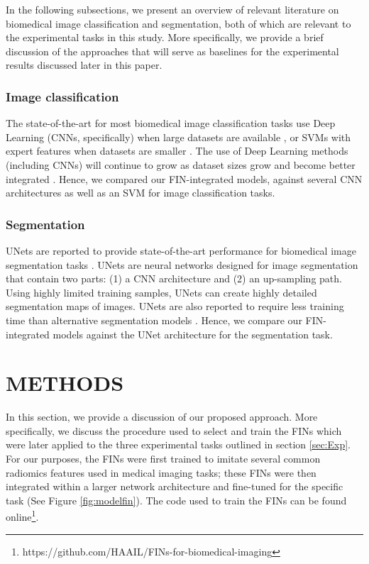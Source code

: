 \documentclass[conference]{IEEEtran}
\begin{document}
In the following subsections, we present an overview of relevant literature on biomedical image classification and segmentation, both of which are relevant to the experimental tasks in this study. More specifically, we provide a brief discussion of the approaches that will serve as baselines for the experimental results discussed later in this paper.

\subsubsection{Image classification}
The state-of-the-art for most biomedical image classification tasks use Deep Learning (CNNs, specifically) when large datasets are available \cite{puttagunta2021medical}, or SVMs with expert features when datasets are smaller \cite{wagner2021radiomics, zhang2023radiomics}. The use of Deep Learning methods (including CNNs) will continue to grow as dataset sizes grow and become better integrated \cite{SABA201914, ibrahim2021radiomics}. Hence, we compared our FIN-integrated models, against several CNN architectures as well as an SVM for image classification tasks.

\subsubsection{Segmentation}
UNets are reported to provide state-of-the-art performance for biomedical image segmentation tasks \cite{kaur2021ga}. UNets are neural networks designed for image segmentation that
contain two parts: (1) a CNN architecture and (2) an up-sampling path. Using highly limited training samples, UNets can create highly detailed segmentation maps of images. UNets are also reported to require less training time than alternative segmentation models \cite{9446143}. Hence, we compare our FIN-integrated models against the UNet architecture for the segmentation task.

\section{METHODS} \label{sec:Meth}
In this section, we provide a discussion of our proposed approach. More specifically, we discuss the procedure used to select and train the FINs which were later applied to the three experimental tasks outlined in section \ref{sec:Exp}. For our purposes, the FINs were first trained to imitate several common radiomics features used in medical imaging tasks; these FINs were then integrated within a larger network architecture and fine-tuned for the specific task (See Figure \ref{fig:modelfin}). The code used to train the FINs can be found online\footnote{https://github.com/HAAIL/FINs-for-biomedical-imaging}.
\end{document}

